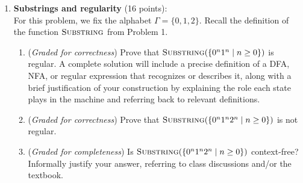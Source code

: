 \documentclass[12pt, oneside]{article}
\newcommand{\gradeCorrect}{({\it Graded for correctness}) }
\newcommand{\gradeComplete}{({\it Graded for completeness}) }
\newcommand{\SUBSTRING}{\textsc{Substring}}
\newcommand{\REP}{\textsc{Rep}}
\begin{document}
\begin{enumerate}
\begin{enumerate}
    \item\gradeCorrect $\REP(\{0^n1^n \mid n \ge 0\})$

    \item\gradeCorrect $\{1^n = 1^a + 1^b \in \{1,=,+\}^* \mid a,b,n \ge 1 \text{ such that } a + b = n \}$
\end{enumerate}

\item \textbf{Substrings and regularity} (16 points): \\
For this problem, we fix the 
alphabet $\Gamma = \{0,1,2\}$. Recall the 
definition of the function $\SUBSTRING$ from 
Problem 1.
\begin{enumerate}
\item\gradeCorrect Prove that $\SUBSTRING(\{ 0^n 1^n \mid n \ge 0\})$ is regular.
A complete 
solution will include a 
precise definition of a DFA, NFA, or regular 
expression that recognizes or describes it, along 
with a brief justification
of your construction by explaining the role each 
state plays in the machine
and referring back to relevant definitions.
\item\gradeCorrect Prove that 
$\SUBSTRING(\{ 0^n 1^n 2^n \mid n \ge 0\})$
is not regular.
\item\gradeComplete Is  $\SUBSTRING(\{ 0^n 1^n 2^n \mid n \ge 0\})$
context-free?
Informally justify your answer, referring 
to class discussions and/or the textbook.

\end{enumerate}
\end{enumerate}
\end{document}
